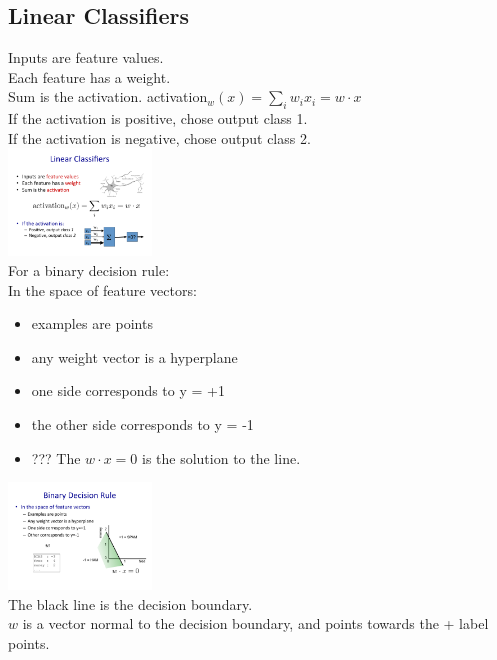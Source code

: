  \subsection{Linear Classifiers}
 Inputs are feature values.  \hfill \\
 Each feature has a weight.  \hfill \\
 Sum is the activation.  activation$_w(x) = \sum_i w_i x_i = w \cdot x$  \hfill \\
 If the activation is positive, chose output class 1.  \hfill \\
 If the activation is negative, chose output class 2.  \hfill \\
 
 \includegraphics[width=1.5in]{figures/linear_classifier_cartoon.pdf}  \hfill \\
 
 For a binary decision rule:   \hfill \\
 In the space of feature vectors: 
 \begin{itemize}
 	\item examples are points
	\item any weight vector is a hyperplane
	\item one side corresponds to y = +1
	\item the other side corresponds to y = -1
	\item ??? The $w \cdot x = 0$ is the solution to the line.
 \end{itemize}
 
 \includegraphics[width=1.5in]{figures/binary_decision_rule.pdf} \hfill \\
 The black line is the decision boundary.     \hfill \\
 $w$ is a vector normal to the decision boundary, and points towards the + label points. 
 
